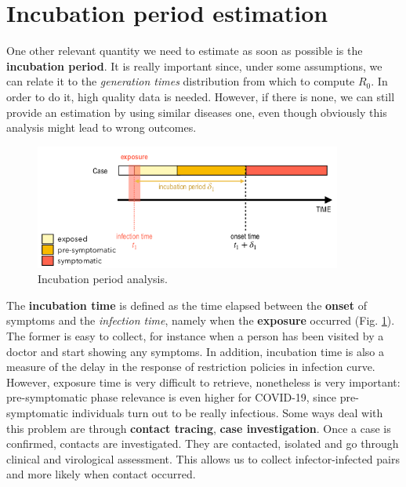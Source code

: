 \documentclass[../main/main.tex]{subfiles}
\begin{document}
\section{Incubation period estimation}

One other relevant quantity we need to estimate as soon as possible is the \textbf{incubation period}. It is really important since, under some assumptions, we can relate it to the \textit{generation times} distribution from which to compute $R_0$. In order to do it, high quality data is needed. However, if there is none, we can still provide an estimation by using similar diseases one, even though obviously this analysis might lead to wrong outcomes.

\begin{figure}[h!]
\centering
\includegraphics[width=0.90\textwidth]{../lessons/image/22/image02.png}
\caption{\label{fig:22_02} Incubation period analysis.}
\end{figure}

The \textbf{incubation time} is defined as the time elapsed between the \textbf{onset} of symptoms and the \textit{infection time}, namely when the \textbf{exposure} occurred (Fig. \ref{fig:22_02}).
The former is easy to collect, for instance when a person has been visited by a doctor and start showing any symptoms. In addition, incubation time is also a measure of the delay in the response of restriction policies in infection curve. However, exposure time is very difficult to retrieve, nonetheless is very important: pre-symptomatic phase relevance is even higher for COVID-19, since pre-symptomatic individuals turn out to be really infectious.  Some ways deal with this problem are through \textbf{contact tracing}, \textbf{case investigation}. Once a case is confirmed, contacts are investigated. They are contacted, isolated and go through clinical and virological assessment. This allows us to collect infector-infected pairs and more likely when contact occurred.
\end{document}
